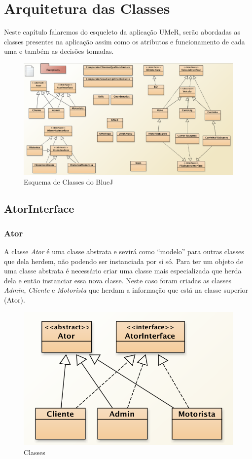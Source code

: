 \chapter{Arquitetura das Classes}
Neste capítulo falaremos do esqueleto da  aplicação UMeR, serão abordadas as classes presentes na aplicação assim como os atributos e funcionamento de cada uma e também as decisões tomadas.
\begin{figure}[htb]
	\centering
	\includegraphics[scale=0.45]{imagem/esquemaClasses}
	\caption{Esquema de Classes do BlueJ }
	\label{p2:fig:p2_classes}
\end{figure}

\newpage

\section{AtorInterface}
 

\subsection{ Ator}
A classe  \textit{Ator} é uma classe abstrata e sevirá  como “modelo” para outras classes que dela herdem, não podendo ser instanciada por si só. Para ter um objeto de uma classe abstrata é necessário criar uma classe mais especializada que herda dela e então instanciar essa nova classe. Neste caso foram criadas as classes \textit{Admin}, \textit{Cliente} e  \textit{Motorista} que herdam a informação que está na classe superior (Ator).

\begin{figure}[htpb]
	\centering
	\includegraphics[scale=0.6]{imagem/atores}
	\caption{Classes }
	\label{p2:fig:p2_atoresr}
\end{figure}

